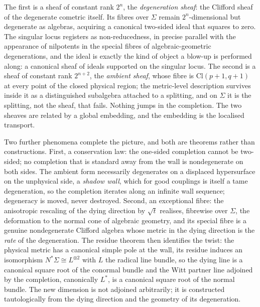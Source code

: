\documentclass[11pt]{article}
\theoremstyle{definition}
\theoremstyle{plain}
\providecommand{\Cl}{}\renewcommand{\Cl}{\mathrm{Cl}}
\providecommand{\Sig}{}\renewcommand{\Sig}{\Sigma}
\providecommand{\shL}{}\renewcommand{\shL}{L}
\begin{document}
The first is a sheaf of constant rank $2^n$, the \emph{degeneration sheaf}: the Clifford sheaf of the degenerate cometric itself. Its fibres over $\Sig$ remain $2^n$-dimensional but degenerate as algebras, acquiring a canonical two-sided ideal that squares to zero. The singular locus registers as non-reducedness, in precise parallel with the appearance of nilpotents in the special fibres of algebraic-geometric degenerations, and the ideal is exactly the kind of object a blow-up is performed along: a canonical sheaf of ideals supported on the singular locus. The second is a sheaf of constant rank $2^{n+2}$, the \emph{ambient sheaf}, whose fibre is $\Cl(p{+}1,q{+}1)$ at every point of the closed physical region; the metric-level description survives inside it as a distinguished subalgebra attached to a splitting, and on $\Sig$ it is the splitting, not the sheaf, that fails. Nothing jumps in the completion. The two sheaves are related by a global embedding, and the embedding is the localised transport.

Two further phenomena complete the picture, and both are theorems rather than constructions. First, a conservation law: the one-sided completion cannot be two-sided; no completion that is standard away from the wall is nondegenerate on both sides. The ambient form necessarily degenerates on a displaced hypersurface on the unphysical side, a \emph{shadow wall}, which for good couplings is itself a tame degeneration, so the completion iterates along an infinite wall sequence; degeneracy is moved, never destroyed. Second, an exceptional fibre: the anisotropic rescaling of the dying direction by $\sqrt{t}$ realises, fibrewise over $\Sig$, the deformation to the normal cone of algebraic geometry, and its special fibre is a genuine nondegenerate Clifford algebra whose metric in the dying direction is the \emph{rate} of the degeneration. The residue theorem then identifies the twist: the physical metric has a canonical simple pole at the wall, its residue induces an isomorphism $N^*\Sig \cong \shL^{\otimes 2}$ with $\shL$ the radical line bundle, so the dying line is a canonical square root of the conormal bundle and the Witt partner line adjoined by the completion, canonically $\shL^*$, is a canonical square root of the normal bundle. The new dimension is not adjoined arbitrarily; it is constructed tautologically from the dying direction and the geometry of its degeneration.
\end{document}

